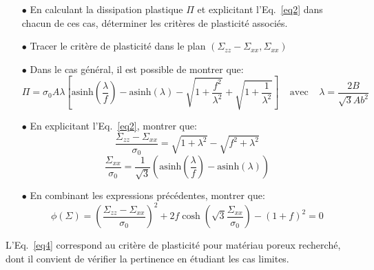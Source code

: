 \documentclass[french,english,12pt]{exam}
\begin{document}
\begin{itemize}
\item[$\bullet$] En calculant la dissipation plastique $\Pi$ et explicitant l'Eq.~\ref{eq2} dans chacun de ces cas, déterminer les critères de plasticité associés.\\

\item[$\bullet$] Tracer le critère de plasticité dans le plan $(\Sigma_{zz} - \Sigma_{xx}, \Sigma_{xx} )$\\

\item[$\bullet$] Dans le cas général, il est possible de montrer que:
  \begin{equation}
    \Pi = \sigma_0 A \lambda \left[ \mathrm{asinh}{\left(   \frac{\lambda}{f} \right)} -\mathrm{asinh}{\left(\lambda\right)}  - \sqrt{1 + \frac{f^2}{\lambda^2}} + \sqrt{1 + \frac{1}{\lambda^2}}    \right] \ \ \ \ \ \mathrm{avec} \ \ \ \ \ \lambda = \frac{2B}{\sqrt{3}Ab^2}
  \end{equation}

\item[$\bullet$] En explicitant l'Eq.~\ref{eq2}, montrer que:
  \begin{equation}
    \frac{\Sigma_{zz} - \Sigma_{xx}}{\sigma_0} = \sqrt{1 + \lambda^2} - \sqrt{f^2 + \lambda^2}
\end{equation}  
    \begin{equation}
    \frac{\Sigma_{xx}}{\sigma_0} = \frac{1}{\sqrt{3}} \left(\mathrm{asinh}{\left( \frac{\lambda}{f} \right)} -\mathrm{asinh}{\left( \lambda \right)}    \right)
\end{equation}  
  
\item[$\bullet$] En combinant les expressions précédentes, montrer que:
  \begin{equation}
   \phi\left( \Sigma     \right)  = \left(  \frac{\Sigma_{zz} - \Sigma_{xx}}{\sigma_0} \right)^2 + 2f \cosh{\left(  \sqrt{3} \frac{\Sigma_{xx}}{\sigma_0} \right)} - (1 + f)^2 = 0
\label{eq4}
  \end{equation}  
\end{itemize}

\noindent
L'Eq.~\ref{eq4} correspond au critère de plasticité pour matériau poreux recherché, dont il convient de vérifier la pertinence en étudiant les cas limites.\\
\end{document}

